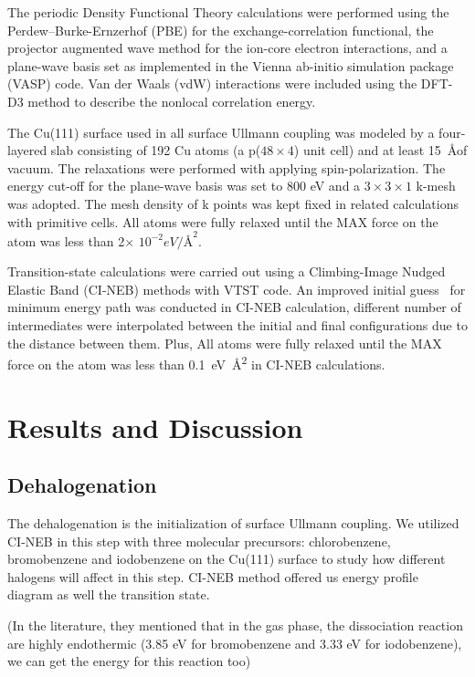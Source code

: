 \documentclass[%
 reprint,
 amsmath,amssymb,
 aps,
prb,
]{revtex4-2}
\begin{document}
The periodic Density Functional Theory calculations were performed using the Perdew–Burke-Ernzerhof (PBE) for the exchange-correlation functional, the projector augmented wave method for the ion-core electron interactions, and a plane-wave basis set as implemented in the Vienna ab-initio simulation package (VASP) code. Van der Waals (vdW) interactions were included using the DFT-D3 method to describe the nonlocal correlation energy. 

The Cu(111) surface used in all surface Ullmann coupling was 
modeled by a four-layered slab consisting of 192 Cu atoms (a p($48\times 4$) unit cell) and at least 15~\AA of vacuum. The relaxations were performed with applying spin-polarization. The energy cut-off for the plane-wave basis was set to 800 eV and a $3\times 3 \times1$ k-mesh was adopted. The mesh density of k points was kept fixed in related calculations with primitive cells. All atoms were fully relaxed until the MAX force on the atom was less than 2$\times$ $10^{-2} eV/\si{\angstrom}^{2}$. 

Transition-state calculations were carried out using a Climbing-Image Nudged Elastic Band (CI-NEB) methods with VTST code\cite{ullmann_59}. An improved initial guess~\cite{ullmann_60} for minimum energy path was conducted in CI-NEB calculation, different number of intermediates were interpolated between the initial and final configurations due to the distance between them. Plus, All atoms were fully relaxed until the MAX force on the atom was less than 0.1~\si{\eV\square\angstrom} in CI-NEB calculations.

\section{Results and Discussion}

\subsection{Dehalogenation}

The dehalogenation is the initialization of surface Ullmann coupling. 
We utilized CI-NEB in this step with three molecular precursors: chlorobenzene, bromobenzene and iodobenzene on the Cu(111) surface to study how different halogens will affect in this step. CI-NEB method offered us energy profile diagram as well the transition state.

(In the literature, they mentioned that in the gas phase, the dissociation reaction are highly endothermic (3.85 eV for bromobenzene and 3.33 eV for iodobenzene), we can get the energy for this reaction too)
\end{document}

